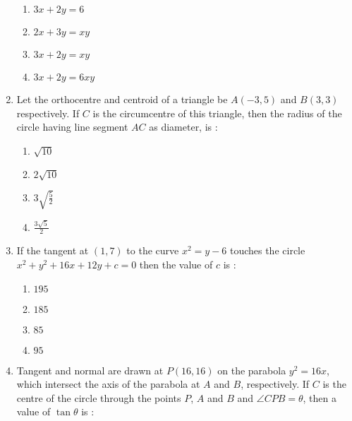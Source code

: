 \documentclass[journal,12pt,twocolumn]{IEEEtran}
\begin{document}
\begin{enumerate}[1.]
\begin{enumerate}[(1)]
\item $
3x+2y=6
$

\item $
2x+3y=xy
$

\item $
3x+2y=xy
$

\item $
3x+2y=6xy
$


\end{enumerate}

\item Let the orthocentre and centroid of a triangle be $A(-3,5)$ and $B(3,3)$ respectively. If $C$ is the circumcentre of this triangle, then the radius of the circle having line segment $AC$ as diameter, is :

\begin{enumerate}[(1)]
 
\item $
\sqrt{10}
$

\item $
2 \sqrt{10}
$

\item $
3 \sqrt{\frac{5}{2}}
$

\item $
\frac{3 \sqrt{5}}{2}
$


\end{enumerate}

\item If the tangent at $(1,7)$ to the curve $x^2=y-6$ touches the circle $x^2+y^2+16x+12y+c=0$ then the value of $c$ is :

\begin{enumerate}[(1)]
 
\item $
195
$

\item $
185
$

\item $
85
$

\item $
95
$

\end{enumerate}

\item Tangent and normal are drawn at $P(16,16)$ on the parabola $y^2=16x$, which intersect the axis of the parabola at $A$ and $B$, respectively. If $C$ is the centre of the circle through the points $P$, $A$ and $B$ and $ \angle CPB=\theta$, then a value of $\tan \theta $ is :


\begin{enumerate}[(1)]
 

\end{enumerate}
\end{enumerate}
\end{document}
